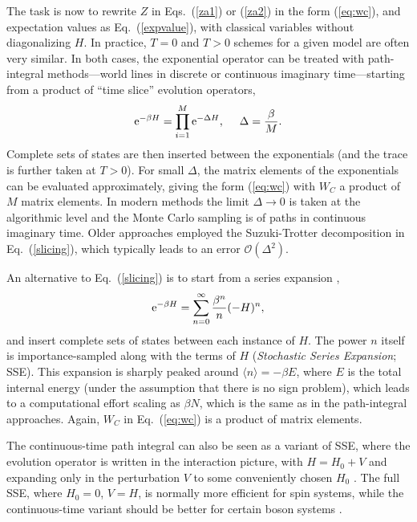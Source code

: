 \documentclass[10pt,pre,aps,twocolumn,showpacs,superscriptaddress,floatfix]{revtex4-1}
\begin{document}
The task is now to rewrite $Z$ in Eqs.~(\ref{za1}) or (\ref{za2}) in the form (\ref{eq:wc}), and expectation values as Eq.~(\ref{expvalue}), with classical variables 
without diagonalizing $H$. In practice, $T=0$ and $T>0$ schemes for a given model are often very similar. In both cases, the exponential 
operator can be treated with path-integral methods---world lines in discrete \cite{Suzuki77,Hirsch82} or continuous \cite{Beard96,Prokofev96,Prokofev98} 
imaginary time---starting from a product of ``time slice'' evolution operators,
\begin{equation}
{\rm e}^{-\beta H}= \prod_{i=1}^M {\rm e}^{-\Delta H},~~~~ \Delta=\frac{\beta}{M}.
\label{slicing}
\end{equation}
Complete sets of states are then inserted between the exponentials (and the trace is further taken at $T>0$). For small $\Delta$, the
matrix elements of the exponentials can be evaluated approximately, giving the form (\ref{eq:wc}) with $W_C$ a product of $M$ matrix elements. 
In modern methods the limit $\Delta \to 0$ is taken at the algorithmic level \cite{Prokofev96,WormA,Beard96} and the Monte Carlo sampling is of 
paths in continuous imaginary time. Older approaches employed the Suzuki-Trotter decomposition \cite{Suzuki76} in Eq.~(\ref{slicing}), which 
typically leads to an error $\mathcal{O}(\Delta^2)$.

An alternative to Eq.~(\ref{slicing}) is to start from a series expansion \cite{Handscomb62,Sandvik91},
\begin{equation}
{\rm e}^{-\beta H}= \sum_{n=0}^\infty \frac{\beta^n}{n}(-H)^n,
\label{series}
\end{equation}
and insert complete sets of states between each instance of $H$. The power $n$ itself is importance-sampled along with the terms of $H$ 
({\it Stochastic Series Expansion}; SSE). This expansion is sharply peaked around $\langle n\rangle = -\beta E$, where $E$ is the total internal energy 
(under the assumption that there is no sign problem), which leads to a computational effort scaling as $\beta N$, which is the same as in the 
path-integral approaches. Again, $W_C$ in Eq.~(\ref{eq:wc}) is a product of matrix elements. 

The continuous-time path integral can also be seen as a variant of SSE, where the evolution operator is written in the interaction picture, 
with $H=H_0+V$ and expanding only in the perturbation $V$ to some conveniently chosen $H_0$ \cite{Prokofev96,Sandvik97a}. The full SSE, where $H_0=0$, $V=H$, 
is normally more efficient for spin systems, while the continuous-time variant should be better for certain boson systems \cite{Troyer03}.
\end{document}
